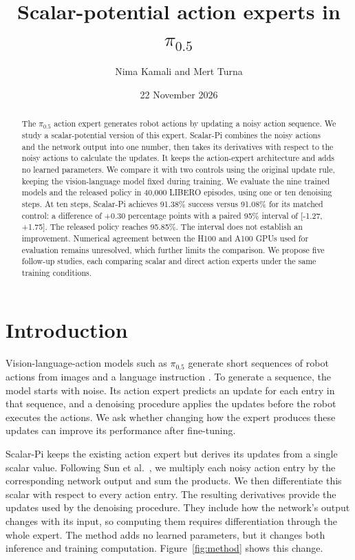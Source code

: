 \documentclass[10pt]{article}
\title{Scalar-potential action experts in $\pi_{0.5}$}
\author{Nima Kamali and Mert Turna}
\date{22 November 2026}
\newcommand{\pihalf}{\pi_{0.5}}
\begin{document}
\maketitle
\begin{abstract}
The $\pihalf$ action expert generates robot actions by updating a noisy action sequence. We study a scalar-potential version of this expert. Scalar-Pi combines the noisy actions and the network output into one number, then takes its derivatives with respect to the noisy actions to calculate the updates. It keeps the action-expert architecture and adds no learned parameters. We compare it with two controls using the original update rule, keeping the vision-language model fixed during training. We evaluate the nine trained models and the released policy in 40,000 LIBERO episodes, using one or ten denoising steps. At ten steps, Scalar-Pi achieves 91.38\% success versus 91.08\% for its matched control: a difference of +0.30 percentage points with a paired 95\% interval of [-1.27, +1.75]. The released policy reaches 95.85\%. The interval does not establish an improvement. Numerical agreement between the H100 and A100 GPUs used for evaluation remains unresolved, which further limits the comparison. We propose five follow-up studies, each comparing scalar and direct action experts under the same training conditions.
\end{abstract}

\section{Introduction}
Vision-language-action models such as $\pihalf$ generate short sequences of robot actions from images and a language instruction \cite{pi05,openpi}. To generate a sequence, the model starts with noise. Its action expert predicts an update for each entry in that sequence, and a denoising procedure applies the updates before the robot executes the actions. We ask whether changing how the expert produces these updates can improve its performance after fine-tuning.

Scalar-Pi keeps the existing action expert but derives its updates from a single scalar value. Following Sun et al.\ \cite{composing}, we multiply each noisy action entry by the corresponding network output and sum the products. We then differentiate this scalar with respect to every action entry. The resulting derivatives provide the updates used by the denoising procedure. They include how the network's output changes with its input, so computing them requires differentiation through the whole expert. The method adds no learned parameters, but it changes both inference and training computation. Figure~\ref{fig:method} shows this change.
\end{document}
